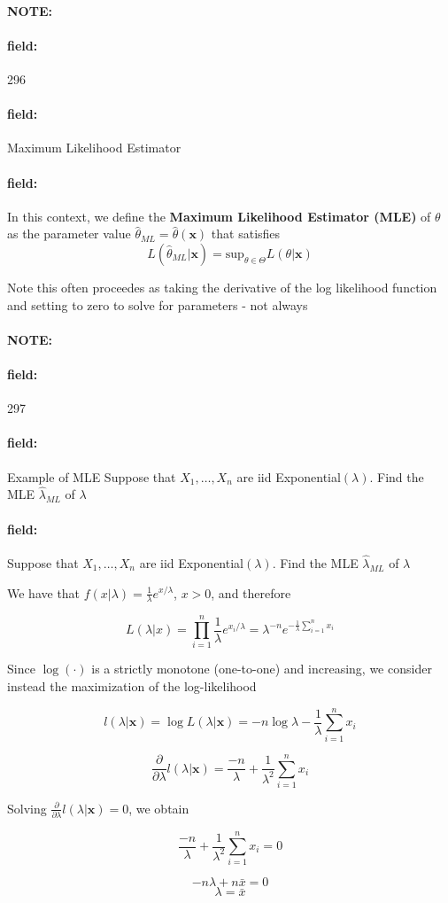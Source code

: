 \documentclass[12pt]{article}
\newenvironment{note}{\paragraph{NOTE:}}{}
\newenvironment{field}{\paragraph{field:}}{}
\begin{document}

\begin{note} \begin{field} \tiny 296 \end{field}
  \begin{field}
    Maximum Likelihood Estimator
  \end{field}
  \begin{field}
    In this context, we define the \textbf{Maximum Likelihood Estimator (MLE)} of $\theta$ as the parameter value $\hat{\theta}_{ML} = \hat{\theta}(\mathbf{x})$ that satisfies
    $$L(\hat{\theta}_{ML}|\mathbf{x}) = \text{sup}_{\theta \in \Theta} L(\theta|\mathbf{x})$$

    Note this often proceedes as taking the derivative of the log likelihood function and setting to zero to solve for parameters - not always
  \end{field}
\end{note}

\begin{note} \begin{field} \tiny 297 \end{field}
  \begin{field}
    Example of MLE
    Suppose that $X_1, \ldots , X_n$ are iid Exponential$(\lambda)$. Find the MLE $\hat{\lambda}_{ML}$ of $\lambda$
  \end{field}
  \begin{field}
    Suppose that $X_1, \ldots , X_n$ are iid Exponential$(\lambda)$. Find the MLE $\hat{\lambda}_{ML}$ of $\lambda$

    We have that $f(x|\lambda) = \frac{1}{\lambda}e^{x/\lambda}$, $x>0$, and therefore

    $$L(\lambda|x) = \prod _{i = 1}^n \frac{1}{\lambda}e^{x_i/\lambda} = \lambda^{-n}e^{-\frac{1}{\lambda}\sum _{i = 1}^n x_i}$$


    Since $\log(\cdot)$ is a strictly monotone (one-to-one) and increasing, we consider instead the maximization of the log-likelihood

    $$l(\lambda|\mathbf{x}) = \log L(\lambda|\mathbf{x}) = -n\log \lambda - \frac{1}{\lambda} \sum _{i = 1}^n x_i$$

    $$\frac{\partial  }{\partial \lambda } l(\lambda | \mathbf{x}) = \frac{-n}{\lambda} + \frac{1}{\lambda^2}\sum _{i = 1}^n x_i$$

    Solving $\frac{\partial  }{\partial \lambda } l(\lambda|\mathbf{x})= 0$, we obtain

    $$ \frac{-n}{\lambda} + \frac{1}{\lambda^2}\sum _{i = 1}^n x_i = 0$$

    $$ -n\lambda + n \bar{x} = 0$$
    $$\lambda = \bar{x}$$

  \end{field}
\end{note}
\end{document}
